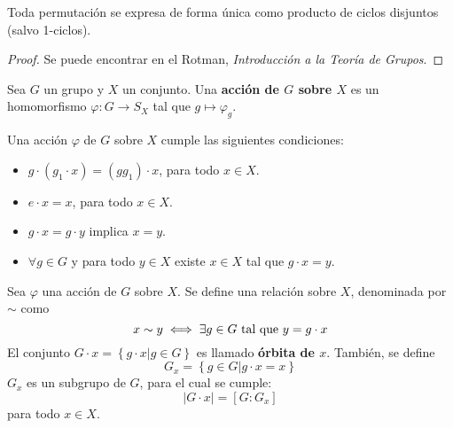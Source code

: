 \documentclass[12pt]{report}
\theoremstyle{largebreak}
\newcommand\abs[1]{\ensuremath{\left|#1\right|}}
\newcommand\cf[3]{\ensuremath{#1:#2\rightarrow#3}}
\begin{document}
    \begin{propo}
        Toda permutación se expresa de forma única como producto de ciclos disjuntos (salvo 1-ciclos).
    \end{propo}

    \begin{proof}
        Se puede encontrar en el Rotman, \textit{Introducción a la Teoría de Grupos}.
    \end{proof}

    \begin{mydef}
        Sea $G$ un grupo y $X$ un conjunto. Una \textbf{acción de $G$ sobre $X$} es un homomorfismo $\cf{\varphi}{G}{S_X}$ tal que $g\mapsto \varphi_g$.
    \end{mydef}

    \begin{obs}
        Una acción $\varphi$ de $G$ sobre $X$ cumple las siguientes condiciones:
        \begin{itemize}
            \item $g\cdot (g_1\cdot x)=(gg_1)\cdot x$, para todo $x\in X$.
            \item $e\cdot x=x$, para todo $x\in X$.
            \item $g\cdot x=g\cdot y$ implica $x=y$.
            \item $\forall g\in G$ y para todo $y\in X$ existe $x\in X$ tal que $g\cdot x=y$.
        \end{itemize}
    \end{obs}

    \begin{mydef}
        Sea $\varphi$ una acción de $G$ sobre $X$. Se define una relación sobre $X$, denominada por $\sim$ como
        \begin{equation*}
            x\sim y\iff \exists g\in G\textup{ tal que }y=g\cdot x
        \end{equation*}
        El conjunto $G\cdot x=\left\{g\cdot x\Big|g\in G \right\}$ es llamado \textbf{órbita de $x$}. También, se define
        \begin{equation*}
            G_x=\left\{g\in G\Big|g\cdot x=x \right\}
        \end{equation*}
        $G_x$ es un subgrupo de $G$, para el cual se cumple:
        \begin{equation*}
            \abs{G\cdot x}=[G:G_x]
        \end{equation*}
        para todo $x\in X$.
    \end{mydef}
\end{document}
